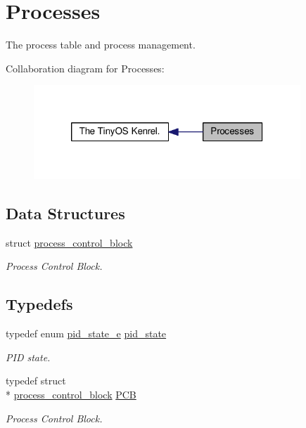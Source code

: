 \hypertarget{group__proc}{\section{Processes}
\label{group__proc}
}


The process table and process management.  


Collaboration diagram for Processes\-:
\nopagebreak
\begin{figure}[H]
\begin{center}
\leavevmode
\includegraphics[width=284pt]{group__proc}
\end{center}
\end{figure}
\subsection*{Data Structures}
\begin{DoxyCompactItemize}
\item 
struct \hyperlink{structprocess__control__block}{process\-\_\-control\-\_\-block}
\begin{DoxyCompactList}\small\item\em Process Control Block. \end{DoxyCompactList}\end{DoxyCompactItemize}
\subsection*{Typedefs}
\begin{DoxyCompactItemize}
\item 
typedef enum \hyperlink{group__proc_ga4f133ac5f9b2ca9c1446889baee1dc05}{pid\-\_\-state\-\_\-e} \hyperlink{group__proc_gade1eea4d20492c4c97263201145e5097}{pid\-\_\-state}
\begin{DoxyCompactList}\small\item\em P\-I\-D state. \end{DoxyCompactList}\item 
typedef struct \\*
\hyperlink{structprocess__control__block}{process\-\_\-control\-\_\-block} \hyperlink{group__proc_gadf327f09ee935cf1734c14e8849f0421}{P\-C\-B}
\begin{DoxyCompactList}\small\item\em Process Control Block. \end{DoxyCompactList}\end{DoxyCompactItemize}
